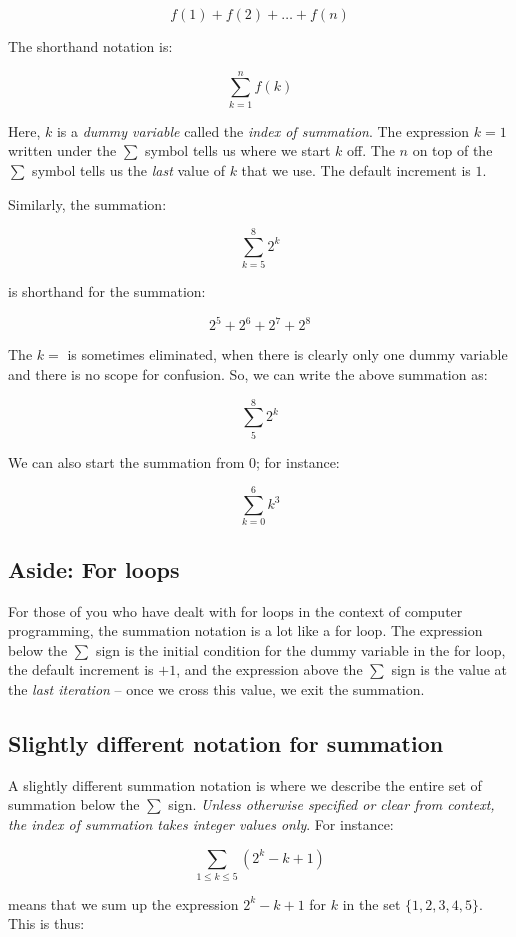 \documentclass{amsart}
\begin{document}
$$f(1) + f(2) + \dots + f(n)$$

The shorthand notation is:

$$\sum_{k=1}^n f(k)$$

Here, $k$ is a {\em dummy variable} called the {\em index of
summation}. The expression $k = 1$ written under the $\sum$ symbol
tells us where we start $k$ off. The $n$ on top of the $\sum$ symbol
tells us the {\em last} value of $k$ that we use. The default
increment is $1$.

Similarly, the summation:

$$\sum_{k=5}^8 2^k$$

is shorthand for the summation:

$$2^5 + 2^6 + 2^7 + 2^8$$

The $k = $ is sometimes eliminated, when there is clearly only one
dummy variable and there is no scope for confusion. So, we can write
the above summation as:

$$\sum_5^8 2^k$$

We can also start the summation from $0$; for instance:

$$\sum_{k=0}^6 k^3$$

\subsection*{Aside: For loops}

For those of you who have dealt with for loops in the context of
computer programming, the summation notation is a lot like a for
loop. The expression below the $\sum$ sign is the initial condition
for the dummy variable in the for loop, the default increment is $+1$,
and the expression above the $\sum$ sign is the value at the {\em last
iteration} -- once we cross this value, we exit the summation.

\subsection{Slightly different notation for summation}

A slightly different summation notation is where we describe the
entire set of summation below the $\sum$ sign. {\em Unless otherwise
specified or clear from context, the index of summation takes integer
values only}. For instance:

$$\sum_{1 \le k \le 5} (2^k - k + 1)$$

means that we sum up the expression $2^k -k + 1$ for $k$ in the set
$\{ 1,2,3,4,5\}$. This is thus:
\end{document}
